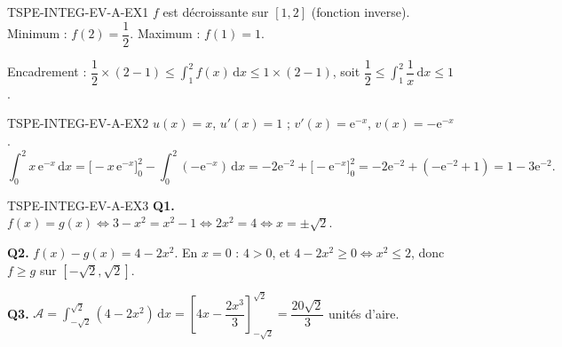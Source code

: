 %
\begin{corrige}{TSPE-INTEG-EV-A-EX1}
$f$ est décroissante sur $[1,2]$ (fonction inverse). Minimum : $f(2)=\dfrac{1}{2}$. Maximum : $f(1)=1$.

Encadrement : $\dfrac{1}{2}\times(2-1) \leq \displaystyle\int_1^2 f(x)\,\mathrm{d}x \leq 1\times(2-1)$, soit $\dfrac{1}{2} \leq \displaystyle\int_1^2 \dfrac{1}{x}\,\mathrm{d}x \leq 1$.
\end{corrige}

\begin{corrige}{TSPE-INTEG-EV-A-EX2}
$u(x)=x$, $u'(x)=1$ ; $v'(x)=\mathrm{e}^{-x}$, $v(x)=-\mathrm{e}^{-x}$.
\[
  \int_0^2 x\,\mathrm{e}^{-x}\,\mathrm{d}x = \big[-x\,\mathrm{e}^{-x}\big]_0^2 - \int_0^2 (-\mathrm{e}^{-x})\,\mathrm{d}x = -2\mathrm{e}^{-2} + \big[-\mathrm{e}^{-x}\big]_0^2 = -2\mathrm{e}^{-2} + (-\mathrm{e}^{-2}+1) = 1-3\mathrm{e}^{-2}.
\]
\end{corrige}

\begin{corrige}{TSPE-INTEG-EV-A-EX3}
\textbf{Q1.} $f(x)=g(x) \iff 3-x^2=x^2-1 \iff 2x^2=4 \iff x=\pm\sqrt{2}$.

\textbf{Q2.} $f(x)-g(x) = 4-2x^2$. En $x=0$ : $4>0$, et $4-2x^2 \geq 0 \iff x^2 \leq 2$, donc $f \geq g$ sur $[-\sqrt{2},\sqrt{2}]$.

\textbf{Q3.} $\mathcal{A} = \displaystyle\int_{-\sqrt{2}}^{\sqrt{2}} (4-2x^2)\,\mathrm{d}x = \left[4x-\dfrac{2x^3}{3}\right]_{-\sqrt{2}}^{\sqrt{2}} = \dfrac{20\sqrt{2}}{3}$ unités d'aire.
\end{corrige}

